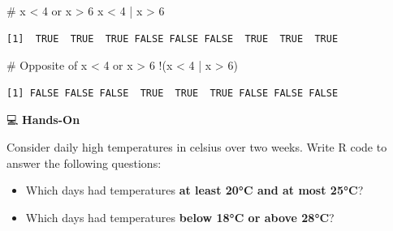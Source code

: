 \documentclass[
  letterpaper,
  DIV=11,
  numbers=noendperiod]{scrreprt}
\newenvironment{Shaded}{\begin{snugshade}}{\end{snugshade}}
\newcommand{\CommentTok}[1]{\textcolor[rgb]{0.37,0.37,0.37}{#1}}
\newcommand{\DecValTok}[1]{\textcolor[rgb]{0.68,0.00,0.00}{#1}}
\newcommand{\NormalTok}[1]{\textcolor[rgb]{0.00,0.23,0.31}{#1}}
\newcommand{\SpecialCharTok}[1]{\textcolor[rgb]{0.37,0.37,0.37}{#1}}
\begin{document}
\begin{tcolorbox}[enhanced jigsaw, colbacktitle=quarto-callout-tip-color!10!white, opacitybacktitle=0.6, breakable, left=2mm, leftrule=.75mm, toprule=.15mm, toptitle=1mm, bottomtitle=1mm, colframe=quarto-callout-tip-color-frame, opacityback=0, coltitle=black, arc=.35mm, titlerule=0mm, colback=white, bottomrule=.15mm, title=\textcolor{quarto-callout-tip-color}{\faLightbulb}\hspace{0.5em}{Answer}, rightrule=.15mm]

\begin{Shaded}
\begin{Highlighting}[]
\CommentTok{\# x \textless{} 4 or x \textgreater{} 6}
\NormalTok{x }\SpecialCharTok{\textless{}} \DecValTok{4} \SpecialCharTok{|}\NormalTok{ x }\SpecialCharTok{\textgreater{}} \DecValTok{6}
\end{Highlighting}
\end{Shaded}

\begin{verbatim}
[1]  TRUE  TRUE  TRUE FALSE FALSE FALSE  TRUE  TRUE  TRUE
\end{verbatim}

\begin{Shaded}
\begin{Highlighting}[]
\CommentTok{\# Opposite of x \textless{} 4 or x \textgreater{} 6}
\SpecialCharTok{!}\NormalTok{(x }\SpecialCharTok{\textless{}} \DecValTok{4} \SpecialCharTok{|}\NormalTok{ x }\SpecialCharTok{\textgreater{}} \DecValTok{6}\NormalTok{)}
\end{Highlighting}
\end{Shaded}

\begin{verbatim}
[1] FALSE FALSE FALSE  TRUE  TRUE  TRUE FALSE FALSE FALSE
\end{verbatim}

\end{tcolorbox}

💻 \textbf{Hands-On}

Consider daily high temperatures in celsius over two weeks. Write R code
to answer the following questions:

\begin{itemize}
\item
  Which days had temperatures \textbf{at least 20°C and at most 25°C}?
\item
  Which days had temperatures \textbf{below 18°C or above 28°C}?
\end{itemize}
\end{document}

